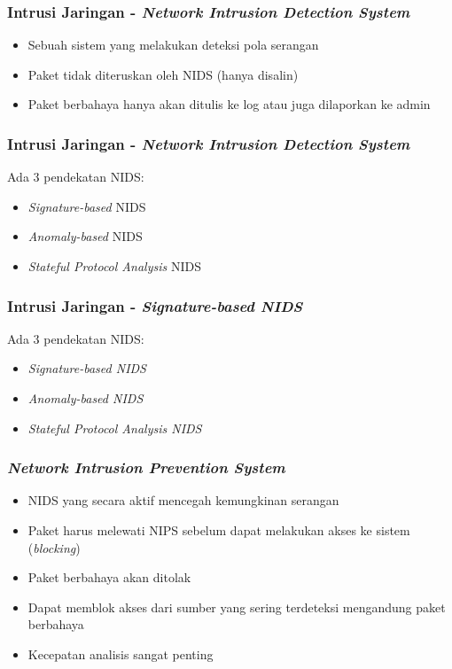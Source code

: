 \documentclass{beamer}
\begin{document}

  \begin{frame}
  \frametitle{Intrusi Jaringan - \emph{Network Intrusion Detection System}}
  \begin{itemize}
    \item Sebuah sistem yang melakukan deteksi pola serangan
    \item Paket tidak diteruskan oleh NIDS (hanya disalin)
    \item Paket berbahaya hanya akan ditulis ke log atau juga dilaporkan ke admin
  \end{itemize}
  \end{frame}
  

  \begin{frame}
  \frametitle{Intrusi Jaringan - \emph{Network Intrusion Detection System}}
  Ada 3 pendekatan NIDS:
  \begin{itemize}
    \item \emph{Signature-based} NIDS
    \item \emph{Anomaly-based} NIDS
    \item \emph{Stateful Protocol Analysis} NIDS
  \end{itemize}
  \end{frame}
  

  \begin{frame}
  \frametitle{Intrusi Jaringan - \emph{Signature-based NIDS}}
  Ada 3 pendekatan NIDS:
  \begin{itemize}
    \item \emph{Signature-based NIDS}
    \item \emph{Anomaly-based NIDS}
    \item \emph{Stateful Protocol Analysis NIDS}
  \end{itemize}
  \end{frame}


  \begin{frame}
  \frametitle{\emph{Network Intrusion Prevention System}}
  \begin{itemize}
    \item NIDS yang secara aktif mencegah kemungkinan serangan
    \item Paket harus melewati NIPS sebelum dapat melakukan akses ke sistem (\emph{blocking})
    \item Paket berbahaya akan ditolak
    \item Dapat memblok akses dari sumber yang sering terdeteksi mengandung paket berbahaya
    \item Kecepatan analisis sangat penting
  \end{itemize}
  \end{frame}
\end{document}
